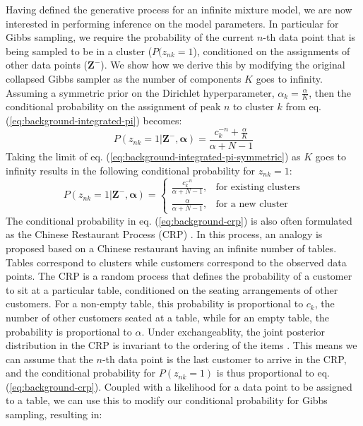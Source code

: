 Having defined the generative process for an infinite mixture model, we are now interested in performing inference on the model parameters. In particular for Gibbs sampling, we require the probability of the current $n$-th data point that is being sampled to be in a cluster ($P(z_{nk}=1$), conditioned on the assignments of other data points ($\boldsymbol{Z}^{-}$). We show how we derive this by modifying the original collapsed Gibbs sampler as the number of components $K$ goes to infinity. Assuming a symmetric prior on the Dirichlet hyperparameter, $\alpha_k=\frac{\alpha}{K}$, then the conditional probability on the assignment of peak $n$ to cluster $k$ from eq. (\ref{eq:background-integrated-pi}) becomes:
\begin{equation}
P(z_{nk}=1 \vert \boldsymbol{Z}^{-}, \boldsymbol{\alpha}) = \frac{c_k^{-n} + \frac{\alpha}{K}}{\alpha+N-1}
\label{eq:background-integrated-pi-symmetric}
\end{equation}
Taking the limit of eq. (\ref{eq:background-integrated-pi-symmetric}) as $K$ goes to infinity results in the following conditional probability for $z_{nk}=1$:
\begin{equation}
P(z_{nk}=1 \vert \boldsymbol{Z}^{-}, \boldsymbol{\alpha}) = 
\begin{cases}
    \frac{c^{-n}_k}{\alpha+N-1}, & \text{for existing clusters} \\
    \frac{\alpha}{\alpha+N-1}, & \text{for a new cluster}
\end{cases}
\label{eq:background-crp}
\end{equation}
The conditional probability in eq. (\ref{eq:background-crp}) is also often formulated as the Chinese Restaurant Process (CRP) \cite{frigyik2010introduction}. In this process, an analogy is proposed based on a Chinese restaurant having an infinite number of tables. Tables correspond to clusters while customers correspond to the observed data points. The CRP is a random process that defines the probability of a customer to sit at a particular table, conditioned on the seating arrangements of other customers. For a non-empty table, this probability is proportional to $c_k$, the number of other customers seated at a table, while for an empty table, the probability is proportional to $\alpha$. Under exchangeablity, the joint posterior distribution in the CRP is invariant to the ordering of the items \cite{aldous1985exchangeability}. This means we can assume that the $n$-th data point is the last customer to arrive in the CRP, and the conditional probability for $P(z_{nk}=1)$ is thus proportional to eq. (\ref{eq:background-crp}). Coupled with a likelihood for a data point to be assigned to a table, we can use this to modify our conditional probability for Gibbs sampling, resulting in:
